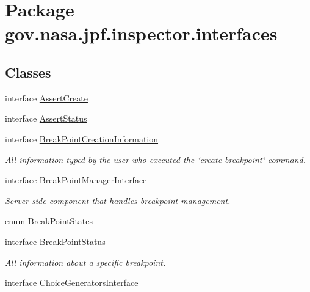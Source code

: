\hypertarget{namespacegov_1_1nasa_1_1jpf_1_1inspector_1_1interfaces}{}\section{Package gov.\+nasa.\+jpf.\+inspector.\+interfaces}
\label{namespacegov_1_1nasa_1_1jpf_1_1inspector_1_1interfaces}
\subsection*{Classes}
\begin{DoxyCompactItemize}
\item 
interface \hyperlink{interfacegov_1_1nasa_1_1jpf_1_1inspector_1_1interfaces_1_1_assert_create}{Assert\+Create}
\item 
interface \hyperlink{interfacegov_1_1nasa_1_1jpf_1_1inspector_1_1interfaces_1_1_assert_status}{Assert\+Status}
\item 
interface \hyperlink{interfacegov_1_1nasa_1_1jpf_1_1inspector_1_1interfaces_1_1_break_point_creation_information}{Break\+Point\+Creation\+Information}
\begin{DoxyCompactList}\small\item\em All information typed by the user who executed the \char`\"{}create breakpoint\char`\"{} command. \end{DoxyCompactList}\item 
interface \hyperlink{interfacegov_1_1nasa_1_1jpf_1_1inspector_1_1interfaces_1_1_break_point_manager_interface}{Break\+Point\+Manager\+Interface}
\begin{DoxyCompactList}\small\item\em Server-\/side component that handles breakpoint management. \end{DoxyCompactList}\item 
enum \hyperlink{enumgov_1_1nasa_1_1jpf_1_1inspector_1_1interfaces_1_1_break_point_states}{Break\+Point\+States}
\item 
interface \hyperlink{interfacegov_1_1nasa_1_1jpf_1_1inspector_1_1interfaces_1_1_break_point_status}{Break\+Point\+Status}
\begin{DoxyCompactList}\small\item\em All information about a specific breakpoint. \end{DoxyCompactList}\item 
interface \hyperlink{interfacegov_1_1nasa_1_1jpf_1_1inspector_1_1interfaces_1_1_choice_generators_interface}{Choice\+Generators\+Interface}

\end{DoxyCompactItemize}
